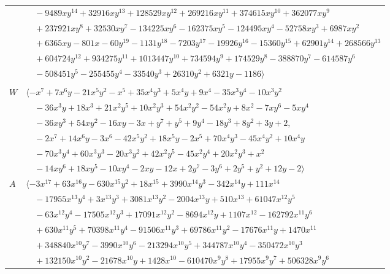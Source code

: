 \documentclass[11pt]{article}
\begin{document}
\begin{longtable}{@{}ll@{}}
 & $\quad -9489xy^{14}+32916xy^{13}+128529xy^{12}+269216xy^{11}+374615xy^{10}+362077xy^{9}$\\
 & $\quad +237921xy^{8}+32530xy^{7}-134225xy^{6}-162375xy^{5}-124495xy^{4}-52758xy^{3}+6987xy^{2}$\\
 & $\quad +6365xy-801x-60y^{19}-1131y^{18}-7203y^{17}-19926y^{16}-15360y^{15}+62901y^{14}+268566y^{13}$\\
 & $\quad +604724y^{12}+934275y^{11}+1013447y^{10}+734594y^{9}+174529y^{8}-388870y^{7}-614587y^{6}$\\
 & $\quad -508451y^{5}-255455y^{4}-33540y^{3}+26310y^{2}+6321y-1186\rangle$\\
\addlinespace[2pt]
\multicolumn{2}{@{}p{0.97\textwidth}@{}}{$i=19$, $D_i=3$, $\rho_{ij}$: $2{:}1, \allowbreak 4{:}1, \allowbreak 5{:}1, \allowbreak 6{:}1, \allowbreak 13{:}2, \allowbreak 16{:}2, \allowbreak 18{:}1$}\\
$W$ & $\langle -x^{7}+7x^{6}y-21x^{5}y^{2}-x^{5}+35x^{4}y^{3}+5x^{4}y+9x^{4}-35x^{3}y^{4}-10x^{3}y^{2}$\\
 & $\quad -36x^{3}y+18x^{3}+21x^{2}y^{5}+10x^{2}y^{3}+54x^{2}y^{2}-54x^{2}y+8x^{2}-7xy^{6}-5xy^{4}$\\
 & $\quad -36xy^{3}+54xy^{2}-16xy-3x+y^{7}+y^{5}+9y^{4}-18y^{3}+8y^{2}+3y+2,$\\
 & $\quad -2x^{7}+14x^{6}y-3x^{6}-42x^{5}y^{2}+18x^{5}y-2x^{5}+70x^{4}y^{3}-45x^{4}y^{2}+10x^{4}y$\\
 & $\quad -70x^{3}y^{4}+60x^{3}y^{3}-20x^{3}y^{2}+42x^{2}y^{5}-45x^{2}y^{4}+20x^{2}y^{3}+x^{2}$\\
 & $\quad -14xy^{6}+18xy^{5}-10xy^{4}-2xy-12x+2y^{7}-3y^{6}+2y^{5}+y^{2}+12y-2\rangle$\\
$A$ & $\langle -3x^{17}+63x^{16}y-630x^{15}y^{2}+18x^{15}+3990x^{14}y^{3}-342x^{14}y+111x^{14}$\\
 & $\quad -17955x^{13}y^{4}+3x^{13}y^{3}+3081x^{13}y^{2}-2004x^{13}y+510x^{13}+61047x^{12}y^{5}$\\
 & $\quad -63x^{12}y^{4}-17505x^{12}y^{3}+17091x^{12}y^{2}-8694x^{12}y+1107x^{12}-162792x^{11}y^{6}$\\
 & $\quad +630x^{11}y^{5}+70398x^{11}y^{4}-91506x^{11}y^{3}+69786x^{11}y^{2}-17676x^{11}y+1470x^{11}$\\
 & $\quad +348840x^{10}y^{7}-3990x^{10}y^{6}-213294x^{10}y^{5}+344787x^{10}y^{4}-350472x^{10}y^{3}$\\
 & $\quad +132150x^{10}y^{2}-21678x^{10}y+1428x^{10}-610470x^{9}y^{8}+17955x^{9}y^{7}+506328x^{9}y^{6}$\\

\end{longtable}
\end{document}
